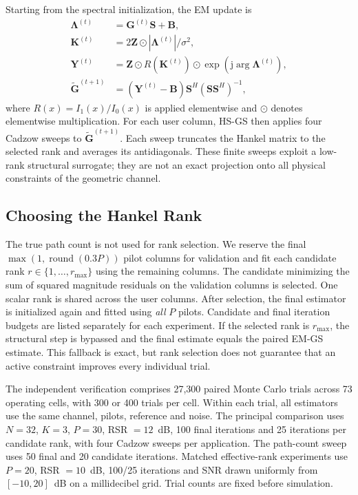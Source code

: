 Starting from the spectral initialization, the EM update is
\begin{align}
\boldsymbol\Lambda^{(t)}&=\mathbf G^{(t)}\mathbf S+\mathbf B,\\
\mathbf K^{(t)}&=2\mathbf Z\odot|\boldsymbol\Lambda^{(t)}|/\sigma^2,\\
\mathbf Y^{(t)}&=\mathbf Z\odot R(\mathbf K^{(t)})
 \odot\exp\!\left(\mathrm{j}\arg\boldsymbol\Lambda^{(t)}\right),\\
\widetilde{\mathbf G}^{(t+1)}&=(\mathbf Y^{(t)}-\mathbf B)
 \mathbf S^H(\mathbf S\mathbf S^H)^{-1},
\end{align}
where $R(x)=I_1(x)/I_0(x)$ is applied elementwise and $\odot$ denotes
elementwise multiplication. For each user column, HS-GS then applies four
Cadzow sweeps to $\widetilde{\mathbf G}^{(t+1)}$. Each sweep truncates the
Hankel matrix to the selected rank and averages its antidiagonals. These
finite sweeps exploit a low-rank structural surrogate; they are not an
exact projection onto all physical constraints of the geometric channel.

\subsection{Choosing the Hankel Rank}
The true path count is not used for rank selection. We reserve the final
$\max(1,\operatorname{round}(0.3P))$ pilot columns for validation and fit
each candidate rank $r\in\{1,\ldots,r_{\max}\}$ using the remaining columns.
The candidate minimizing the sum of squared magnitude residuals on the
validation columns is selected. One scalar rank is shared across the user
columns. After selection, the final estimator is initialized again and
fitted using \emph{all} $P$ pilots. Candidate and final iteration budgets
are listed separately for each experiment. If the selected rank is
$r_{\max}$, the structural step is bypassed and the final estimate equals
the paired EM-GS estimate. This fallback is exact, but rank selection does
not guarantee that an active constraint improves every individual trial.

The independent verification comprises 27,300 paired Monte Carlo trials
across 73 operating cells, with 300 or 400 trials per cell. Within each
trial, all estimators use the same channel, pilots, reference and noise.
The principal comparison uses $N=32$, $K=3$, $P=30$, RSR $=12$~dB,
100 final iterations and 25 iterations per candidate rank, with four
Cadzow sweeps per application. The path-count sweep uses 50 final and
20 candidate iterations. Matched effective-rank experiments use $P=20$,
RSR $=10$~dB, 100/25 iterations and SNR drawn uniformly from $[-10,20]$~dB
on a millidecibel grid. Trial counts are fixed before simulation.

